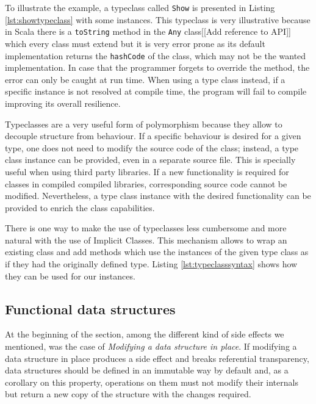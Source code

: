 \documentclass[../main.tex]{subfiles}
\begin{document}
To illustrate the example, a typeclass called \texttt{Show} is presented in
Listing \ref{lst:showtypeclass} with some instances. This typeclass is very
illustrative because in Scala there is a \texttt{toString} method in the
\texttt{Any} class[[Add reference to API]] which every class must extend but it
is very error prone as its default implementation returns the \texttt{hashCode} of the
class, which may not be the wanted implementation. In case that the programmer
forgets to override the method, the error can only be caught at run time. When
using a type class instead, if a specific instance is not resolved at compile time, the
program will fail to compile improving its overall resilience.



Typeclasses are a very useful form of polymorphism because they allow to decouple structure from
behaviour. If a specific behaviour is desired for a given type, one does not need
to modify the source code of the class; instead, a type class instance can be provided, even
in a separate source file. This is specially useful when using third party
libraries. If a new functionality is required for classes in compiled compiled libraries,
corresponding source code cannot be modified. Nevertheless, a type class instance
with the desired functionality can be provided to enrich the class capabilities.

There is one way to make the use of typeclasses less cumbersome and more natural
with the use of Implicit Classes. This mechanism allows to wrap an existing
class and add methods which use the instances of the given type class as if they
had the originally defined type. Listing \ref{lst:typeclasssyntax}
shows how they can be used for our instances.




\subsection{Functional data structures} At the beginning of the section, among
the different kind of side effects we mentioned, was the case of \textit{Modifying a
data structure in place}. If modifying a data structure in place produces a side
effect and breaks referential transparency, data structures should be defined in an
immutable way by default and, as a corollary on this property, operations on them
must not modify their internals but return a new copy of the structure with the changes required.
\end{document}
